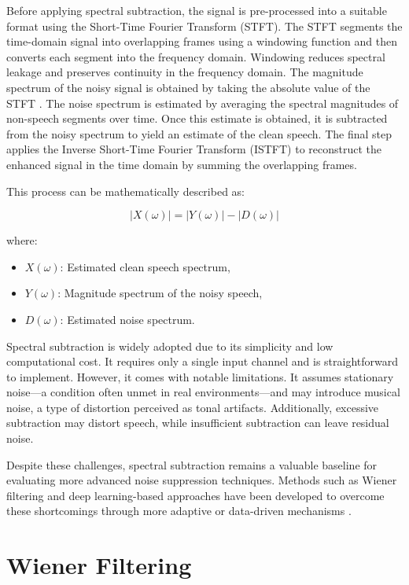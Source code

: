 Before applying spectral subtraction, the signal is pre-processed into a suitable format using the Short-Time Fourier Transform (STFT). The STFT segments the time-domain signal into overlapping frames using a windowing function and then converts each segment into the frequency domain. Windowing reduces spectral leakage and preserves continuity in the frequency domain. The magnitude spectrum of the noisy signal is obtained by taking the absolute value of the STFT \cite{dubey2016evaluation}. The noise spectrum is estimated by averaging the spectral magnitudes of non-speech segments over time. Once this estimate is obtained, it is subtracted from the noisy spectrum to yield an estimate of the clean speech. The final step applies the Inverse Short-Time Fourier Transform (ISTFT) to reconstruct the enhanced signal in the time domain by summing the overlapping frames.

This process can be mathematically described as:

\begin{equation}
    |X(\omega)| = |Y(\omega)| - |D(\omega)|
\end{equation}

where:
\begin{itemize}
    \item \( X(\omega) \): Estimated clean speech spectrum,
    \item \( Y(\omega) \): Magnitude spectrum of the noisy speech,
    \item \( D(\omega) \): Estimated noise spectrum.
\end{itemize}

Spectral subtraction is widely adopted due to its simplicity and low computational cost. It requires only a single input channel and is straightforward to implement. However, it comes with notable limitations. It assumes stationary noise—a condition often unmet in real environments—and may introduce musical noise, a type of distortion perceived as tonal artifacts. Additionally, excessive subtraction may distort speech, while insufficient subtraction can leave residual noise.

Despite these challenges, spectral subtraction remains a valuable baseline for evaluating more advanced noise suppression techniques. Methods such as Wiener filtering and deep learning-based approaches have been developed to overcome these shortcomings through more adaptive or data-driven mechanisms \cite{loizou2013speech}.


\section{Wiener Filtering}
\label{sec:wiener_filtering}

